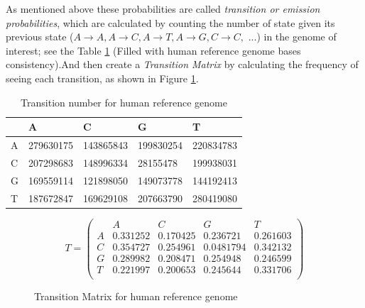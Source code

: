 \documentclass[11pt,a4paper]{report}
\begin{document}
As mentioned above these probabilities are called \emph{transition or emission 
probabilities}, which are calculated by counting the number of state given its 
previous state ($ A \rightarrow A, A\rightarrow C, A \rightarrow T, A \rightarrow 
G, C \rightarrow C,$ ...) in the genome of interest; see the Table \ref{transition-table}
(Filled with human reference genome bases consistency).And then create a 
\emph{Transition Matrix} by calculating the frequency of seeing each transition,
as shown in Figure \ref{transition-matrix}.\\

\begin{table}[h]
  \begin{tabular}{ |  p{1cm} | p{2cm} | p{2cm} | p{2cm} | p{2cm} |}
    \hline
  	  
 	             & A   & C & G & T \\ \hline
      A  & 279630175  & 143865843 & 199830254 & 220834783 \\ \hline
 	  C	 & 207298683  & 148996334 & 28155478 & 199938031\\ \hline
 	  G	 & 169559114  & 121898050 & 149073778 & 144192413\\ \hline
 	  T  & 187672847  & 169629108  & 207663790 & 280419080\\ \hline
      
 	  
   \end{tabular}
  \caption{Transition number for human reference genome}
 \label{transition-table}
\end{table}



\begin{figure}[H]
 \centering
\[
T = 
 \begin{pmatrix}
   &  A  & C & G & T  \\
 A & 0.331252 & 0.170425 & 0.236721 & 0.261603  \\
 C & 0.354727 & 0.254961 & 0.0481794 & 0.342132  \\
 G & 0.289982 & 0.208471 & 0.254948 & 0.246599  \\
 T & 0.221997 & 0.200653 & 0.245644 & 0.331706 \\
  
 \end{pmatrix}
\]
 \caption{Transition Matrix for human reference genome}
 \label{transition-matrix}
\end{figure}
\end{document}
